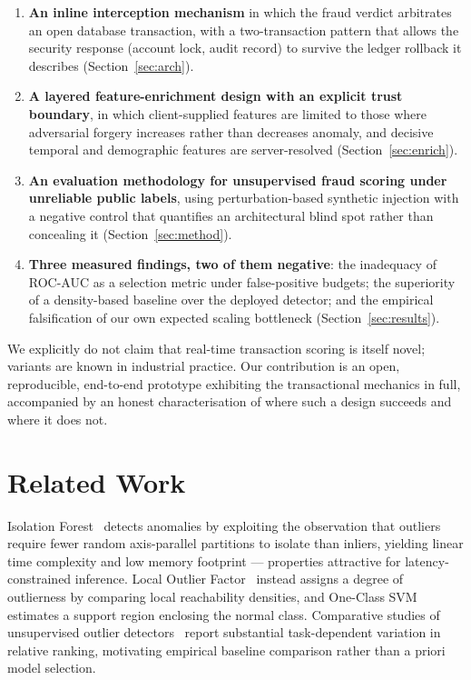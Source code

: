 \documentclass[conference]{IEEEtran}
\begin{document}
\begin{enumerate}
\item \textbf{An inline interception mechanism} in which the fraud verdict
arbitrates an open database transaction, with a two-transaction pattern that
allows the security response (account lock, audit record) to survive the
ledger rollback it describes (Section~\ref{sec:arch}).

\item \textbf{A layered feature-enrichment design with an explicit trust
boundary}, in which client-supplied features are limited to those where
adversarial forgery increases rather than decreases anomaly, and decisive
temporal and demographic features are server-resolved
(Section~\ref{sec:enrich}).

\item \textbf{An evaluation methodology for unsupervised fraud scoring under
unreliable public labels}, using perturbation-based synthetic injection with
a negative control that quantifies an architectural blind spot rather than
concealing it (Section~\ref{sec:method}).

\item \textbf{Three measured findings, two of them negative}: the
inadequacy of ROC-AUC as a selection metric under false-positive budgets;
the superiority of a density-based baseline over the deployed detector; and
the empirical falsification of our own expected scaling bottleneck
(Section~\ref{sec:results}).
\end{enumerate}

We explicitly do not claim that real-time transaction scoring is itself
novel; variants are known in industrial practice. Our contribution is an
open, reproducible, end-to-end prototype exhibiting the transactional
mechanics in full, accompanied by an honest characterisation of where such a
design succeeds and where it does not.

\section{Related Work}

Isolation Forest~\cite{liu2008} detects anomalies by exploiting the
observation that outliers require fewer random axis-parallel partitions to
isolate than inliers, yielding linear time complexity and low memory
footprint --- properties attractive for latency-constrained inference. Local
Outlier Factor~\cite{breunig2000} instead assigns a degree of outlierness by
comparing local reachability densities, and One-Class SVM~\cite{scholkopf2001}
estimates a support region enclosing the normal class. Comparative studies of
unsupervised outlier detectors~\cite{campos2016} report substantial
task-dependent variation in relative ranking, motivating empirical baseline
comparison rather than a priori model selection.
\end{document}
